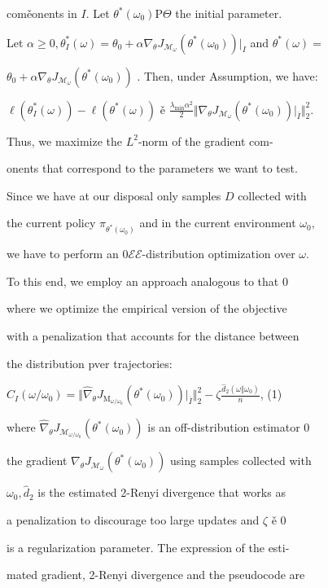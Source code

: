 \documentclass[a4paper,12pt]{article}
\begin{document}
coměonents in $I$. Let $\theta^{*}(\omega_{0}) \mathrm{P} \Theta$ the initial parameter.

Let $\alpha\geq 0, \theta_{I}^{*}(\omega)=\theta_{0}+\alpha\nabla_{\theta}J_{\mathcal{M}_{\omega}}(\theta^{*}(\omega_{0}))|_{I}$ and $\theta^{*}(\omega)=$

$\theta_{0}+\alpha\nabla_{\theta}J_{\mathcal{M}_{\omega}}(\theta^{*}(\omega_{0}))$ . Then, under Assumption, we have:

$\ell(\theta_{I}^{*}(\omega))-\ell(\theta^{*}(\omega))$ ě $\displaystyle \frac{\lambda_{\min}\alpha^{2}}{2}\Vert\nabla_{\theta}J_{\mathcal{M}_{\omega}}(\theta^{*}(\omega_{0}))|_{\overline{I}}\Vert_{2}^{2}.$

Thus, we maximize the $L^{2}$-norm of the gradient com-

onents that correspond to the parameters we want to test.

Since we have at our disposal only samples $D$ collected with

the current policy $\pi_{\theta^{*}(\omega_{0})}$ and in the current environment $\omega_{0},$

we have to perform an $0\mathcal{E}\mathcal{E}$-distribution optimization over $\omega.$

To this end, we employ an approach analogous to that $0$

where we optimize the empirical version of the objective

with a penalization that accounts for the distance between

the distribution pver trajectories:

$ C_{I}(\omega/\omega_{0})=\Vert\hat{\nabla}_{\theta}J_{\mathrm{M}_{\omega/\omega_{0}}}(\theta^{*}(\omega_{0}))|_{\overline{I}}\Vert_{2}^{2}-\zeta \displaystyle \frac{\hat{d}_{2}(\omega\Vert\omega_{0})}{n}$, (1)

where $\hat{\nabla}_{\theta}J_{\mathcal{M}_{\omega/\omega_{0}}}(\theta^{*}(\omega_{0}))$ is an off-distribution estimator $0$

the gradient $\nabla_{\theta}J_{\mathcal{M}_{\omega}}(\theta^{*}(\omega_{0}))$ using samples collected with

$\omega_{0}, \hat{d}_{2}$ is the estimated 2-Renyi divergence that works as

a penalization to discourage too large updates and $\zeta$ ě $0$

is a regularization parameter. The expression of the esti-

mated gradient, 2-Renyi divergence and the pseudocode are
\end{document}
